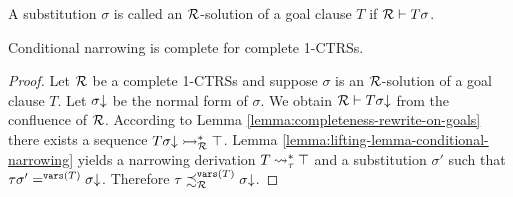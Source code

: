 \begin{definition}\label{definition:CTRS-sub-solution}
	A substitution $\sigma$ is called an $\mathcal{R}$-solution of a goal clause $T$ if $\mathcal{R} \vdash T\sigma$.
\end{definition}

\begin{theorem}
	Conditional narrowing is complete for complete 1-CTRSs.
	\begin{proof}
		Let $\mathcal{R}$ be a complete 1-CTRSs and suppose $\sigma$ is an $\mathcal{R}$-solution of a goal clause $T$. Let $\sigma\mathord{\downarrow}$ be the normal form of $\sigma$. We obtain $\mathcal{R} \vdash T \sigma\mathord{\downarrow}$ from the confluence of $\mathcal{R}$. According to Lemma \ref{lemma:completeness-rewrite-on-goals} there exists a sequence $T \sigma\mathord{\downarrow} \rightarrowtail^*_{\mathcal{R}} \top$. Lemma \ref{lemma:lifting-lemma-conditional-narrowing} yields a narrowing derivation $T \mathbin{\rightsquigarrow}^*_\tau \top$ and a substitution $\sigma'$ such that $\tau \sigma' =^{\mathtt{vars}(T)} \sigma\mathord{\downarrow}$. Therefore $\tau \iqoless[\trs][\vars{T}] \trsNF{\sigma}$.
	\end{proof}
\end{theorem}

